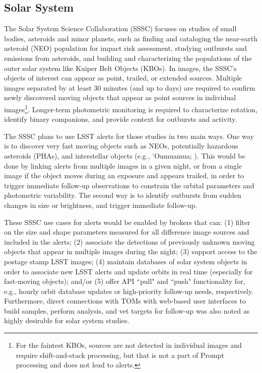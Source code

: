 \subsection{Solar System}\label{ssec:sci_ss}

The Solar System Science Collaboration (SSSC) focuses on studies of small bodies, asteroids and minor planets, such as finding and cataloging the near-earth asteroid (NEO) population for impact risk assessment, studying outbursts and emissions from asteroids, and building and characterizing the populations of the outer solar system like Kuiper Belt Objects (KBOs). In images, the SSSC's objects of interest can appear as point, trailed, or extended sources. Multiple images separated by at least 30 minutes (and up to days) are required to confirm newly discovered moving objects that appear as point sources in individual images\footnote{For the faintest KBOs, sources are not detected in individual images and require shift-and-stack processing, but that is not a part of Prompt processing and does not lead to alerts.}. Longer-term photometric monitoring is required to characterize rotation, identify binary companions, and provide context for outbursts and activity. 

The SSSC plans to use LSST alerts for those studies in two main ways. One way is to discover very fast moving objects such as NEOs, potentially hazardous asteroids (PHAs), and interstellar objects (e.g., 'Oumuamua; \citealt{Meech2017}). This would be done by linking alerts from multiple images in a given night, or from a single image if the object moves during an exposure and appears trailed, in order to trigger immediate follow-up observations to constrain the orbital parameters and photometric variability. The second way is to identify outbursts from sudden changes in size or brightness, and trigger immediate follow-up. 

These SSSC use cases for alerts would be enabled by brokers that can: (1) filter on the size and shape parameters measured for all difference image sources and included in the alerts; (2) associate the detections of previously unknown moving objects that appear in multiple images during the night; (3) support access to the postage stamp LSST images; (4) maintain databases of solar system objects in order to associate new LSST alerts and update orbits in real time (especially for fast-moving objects); and/or (5) offer API ``pull" and ``push" functionality for, e.g., hourly orbit database updates or high-priority follow-up needs, respectively. Furthermore, direct connections with TOMs with web-based user interfaces to build samples, perform analysis, and vet targets for follow-up was also noted as highly desirable for solar system studies. 

